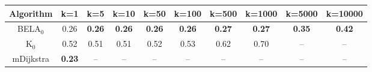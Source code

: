 \begin{tabular}{c|ccccccccc}\toprule
Algorithm & k=1 & k=5 & k=10 & k=50 & k=100 & k=500 & k=1000 & k=5000 & k=10000 \\ \midrule
BELA$_0$ & 0.26 & \textbf{0.26} & \textbf{0.26} & \textbf{0.26} & \textbf{0.26} & \textbf{0.27} & \textbf{0.27} & \textbf{0.35} & \textbf{0.42} \\
K$_0$ & 0.52 & 0.51 & 0.51 & 0.52 & 0.53 & 0.62 & 0.70 & -- & -- \\
mDijkstra & \textbf{0.23} & -- & -- & -- & -- & -- & -- & -- & -- \\ \bottomrule 
\end{tabular}

